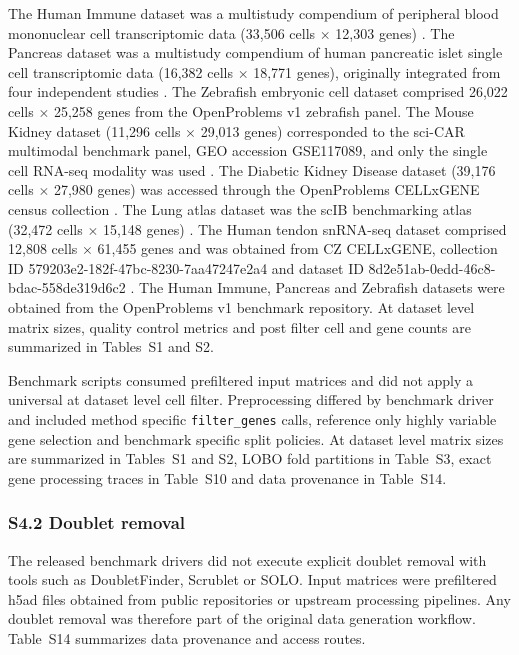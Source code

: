 \documentclass[11pt]{article}
\begin{document}
The Human Immune dataset was a multistudy compendium of peripheral blood mononuclear cell transcriptomic data (33,506 cells \(\times\) 12,303 genes) \cite{Villani2017Immune}. The Pancreas dataset was a multistudy compendium of human pancreatic islet single cell transcriptomic data (16,382 cells \(\times\) 18,771 genes), originally integrated from four independent studies \cite{Baron2016Pancreas,Segerstolpe2016Pancreas,Xin2016Pancreas,Lawlor2017Pancreas}. The Zebrafish embryonic cell dataset comprised 26,022 cells \(\times\) 25,258 genes from the OpenProblems v1 zebrafish panel. The Mouse Kidney dataset (11,296 cells \(\times\) 29,013 genes) corresponded to the sci-CAR multimodal benchmark panel, GEO accession GSE117089, and only the single cell RNA-seq modality was used \cite{Cao2018sciCAR}. The Diabetic Kidney Disease dataset (39,176 cells \(\times\) 27,980 genes) was accessed through the OpenProblems CELLxGENE census collection \cite{Muto2021Kidney,Wilson2022DKD}. The Lung atlas dataset was the scIB benchmarking atlas (32,472 cells \(\times\) 15,148 genes) \cite{Luecken2022IntegrationBenchmark}. The Human tendon snRNA-seq dataset comprised 12,808 cells \(\times\) 61,455 genes and was obtained from CZ CELLxGENE, collection ID 579203e2-182f-47bc-8230-7aa47247e2a4 and dataset ID 8d2e51ab-0edd-46c8-bdac-558de319d6c2 \cite{Tendon202x}. The Human Immune, Pancreas and Zebrafish datasets were obtained from the OpenProblems v1 benchmark repository. At dataset level matrix sizes, quality control metrics and post filter cell and gene counts are summarized in Tables~S1 and S2.

Benchmark scripts consumed prefiltered input matrices and did not apply a universal at dataset level cell filter. Preprocessing differed by benchmark driver and included method specific \texttt{filter\_genes} calls, reference only highly variable gene selection and benchmark specific split policies. At dataset level matrix sizes are summarized in Tables~S1 and S2, LOBO fold partitions in Table~S3, exact gene processing traces in Table~S10 and data provenance in Table~S14.

\subsubsection*{S4.2 Doublet removal}

The released benchmark drivers did not execute explicit doublet removal with tools such as DoubletFinder, Scrublet or SOLO. Input matrices were prefiltered h5ad files obtained from public repositories or upstream processing pipelines. Any doublet removal was therefore part of the original data generation workflow. Table~S14 summarizes data provenance and access routes.
\end{document}
